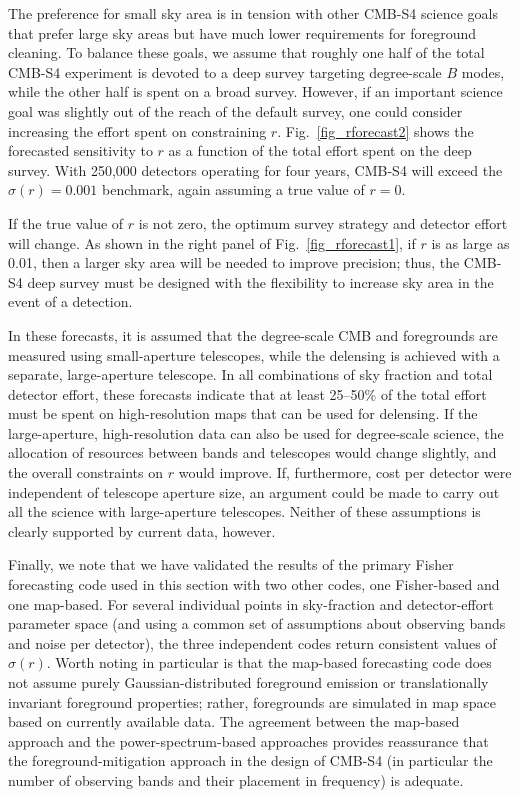 The preference for small sky area is in tension with other CMB-S4 science goals that prefer large sky areas but have much lower requirements for foreground cleaning.
To balance these goals, we assume that roughly one half of the total CMB-S4 experiment is devoted to a deep survey targeting degree-scale $B$ modes, while the other half is spent on a broad survey.
However, if an important science goal was slightly out of the reach of the default survey, one could consider increasing the effort spent on constraining $r$.
Fig.~\ref{fig_rforecast2} shows the forecasted sensitivity to $r$ as a function of the total effort spent on the deep survey.
With 250,000 detectors operating for four years, CMB-S4 will exceed the $\sigma(r)=0.001$ benchmark, again assuming a true value of $r=0$.

If the true value of $r$ is not zero, the optimum survey strategy and detector effort will change.
As shown in the right panel of Fig.~\ref{fig_rforecast1}, if $r$ is as large as 0.01, then a larger sky area will be needed to improve precision; thus, the CMB-S4 deep survey must be designed with the flexibility to increase sky area in the event of a detection.

In these forecasts, it is assumed that the degree-scale CMB and foregrounds are measured using small-aperture telescopes, while the delensing is achieved with a separate, large-aperture telescope. 
In all combinations of sky fraction and total detector effort, these forecasts indicate that at least 25--50\% of the total effort must be spent on high-resolution maps that can be used for delensing.
If the large-aperture, high-resolution data can also be used for degree-scale science, the allocation of resources between bands and telescopes would change slightly, and the overall constraints on $r$ would improve. 
If, furthermore, cost per detector were independent of telescope aperture size, an argument could be made to carry out all the science with large-aperture telescopes. 
Neither of these assumptions is clearly supported by current data, however.

Finally, we note that we have validated the results of the primary Fisher forecasting code used in this section with two other codes, one Fisher-based and one map-based. 
For several individual points in sky-fraction and detector-effort parameter space (and using a common set of assumptions about observing bands and noise per detector), the three independent codes return consistent values of $\sigma(r)$.
Worth noting in particular is that the map-based forecasting code does not assume purely Gaussian-distributed foreground emission or translationally invariant foreground properties; rather, foregrounds are simulated in map space based on currently available data.
The agreement between the map-based approach and the power-spectrum-based approaches provides reassurance that the foreground-mitigation approach in the design of CMB-S4 (in particular the number of observing bands and their placement in frequency) is adequate.

